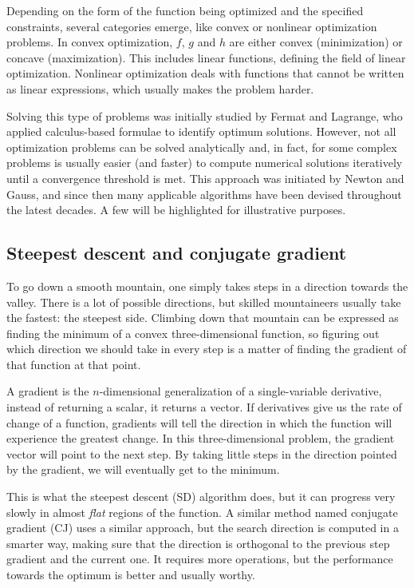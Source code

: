 Depending on the form of the function being optimized and the specified constraints, several categories emerge, like convex or nonlinear optimization problems. In convex optimization, $f$, $g$ and $h$ are either convex (minimization) or concave (maximization). This includes linear functions, defining the field of linear optimization. Nonlinear optimization deals with functions that cannot be written as linear expressions, which usually makes the problem harder.

Solving this type of problems was initially studied by Fermat and Lagrange, who applied calculus-based formulae to identify optimum solutions. However, not all optimization problems can be solved analytically and, in fact, for some complex problems is usually easier (and faster) to compute numerical solutions iteratively until a convergence threshold is met. This approach was initiated by Newton and Gauss, and since then many applicable algorithms have been devised throughout the latest decades. A few will be highlighted for illustrative purposes.

\subsection{Steepest descent and conjugate gradient}
To go down a smooth mountain, one simply takes steps in a direction towards the valley. There is a lot of possible directions, but skilled mountaineers usually take the fastest: the steepest side. Climbing down that mountain can be expressed as finding the minimum of a convex three-dimensional function, so figuring out which direction we should take in every step is a matter of finding the gradient of that function at that point.

A gradient is the $n$-dimensional generalization of a single-variable derivative, instead of returning a scalar, it returns a vector. If derivatives give us the rate of change of a function, gradients will tell the direction in which the function will experience the greatest change. In this three-dimensional problem, the gradient vector will point to the next step. By taking little steps in the direction pointed by the gradient, we will eventually get to the minimum.

This is what the steepest descent (SD) algorithm does, but it can progress very slowly in almost \textit{flat} regions of the function. A similar method named conjugate gradient (CJ) uses a similar approach, but the search direction is computed in a smarter way, making sure that the direction is orthogonal to the previous step gradient and the current one. It requires more operations, but the performance towards the optimum is better and usually worthy.

